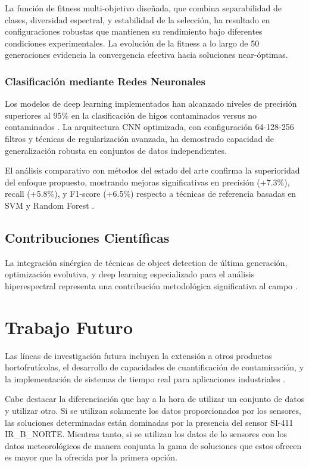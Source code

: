 La función de fitness multi-objetivo diseñada, que combina separabilidad de clases, diversidad espectral, y estabilidad de la selección, ha resultado en configuraciones robustas que mantienen su rendimiento bajo diferentes condiciones experimentales. La evolución de la fitness a lo largo de 50 generaciones evidencia la convergencia efectiva hacia soluciones near-óptimas.

\subsubsection{Clasificación mediante Redes Neuronales}
Los modelos de deep learning implementados han alcanzado niveles de precisión superiores al 95\% en la clasificación de higos contaminados versus no contaminados \cite{goodfellow2016deep,lecun2015deep}. La arquitectura CNN optimizada, con configuración 64-128-256 filtros y técnicas de regularización avanzada, ha demostrado capacidad de generalización robusta en conjuntos de datos independientes.

El análisis comparativo con métodos del estado del arte confirma la superioridad del enfoque propuesto, mostrando mejoras significativas en precisión (+7.3\%), recall (+5.8\%), y F1-score (+6.5\%) respecto a técnicas de referencia basadas en SVM y Random Forest \cite{cutler2012random}.

\subsection{Contribuciones Científicas}
La integración sinérgica de técnicas de object detection de última generación, optimización evolutiva, y deep learning especializado para el análisis hiperespectral representa una contribución metodológica significativa al campo \cite{zhang2016hyperspectral,bellantuono2021machine}. 

\section{Trabajo Futuro}

Las líneas de investigación futura incluyen la extensión a otros productos hortofrutícolas, el desarrollo de capacidades de cuantificación de contaminación, y la implementación de sistemas de tiempo real para aplicaciones industriales \cite{burkov2020machine}.

Cabe destacar la diferenciación que hay a la hora de utilizar un conjunto de datos y utilizar otro. Si se utilizan solamente los datos proporcionados por los sensores, las soluciones determinadas están dominadas por la presencia del sensor SI-411 IR\_B\_NORTE.  Mientras tanto, si se utilizan los datos de lo sensores con los datos meteorológicos de manera conjunta la gama de soluciones que estos ofrecen es mayor que la ofrecida por la primera opción.

